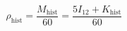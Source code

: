 \setcounter{equation}{36}
\begin{equation}
\rho_{\mathrm{hist}}=\frac{M_{\mathrm{hist}}}{60}
=\frac{5I_{12}+K_{\mathrm{hist}}}{60}
\end{equation}
